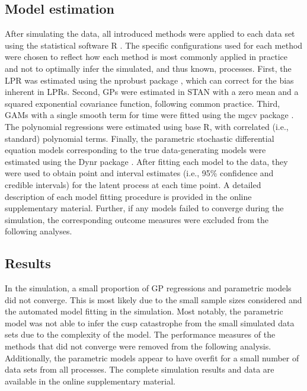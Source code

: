 \documentclass[man, floatsintext]{apa7}
\begin{document}
\subsection{Model estimation}

After simulating the data, all introduced methods were applied to each data set
using the statistical software R \parencite{R-base}. The specific
configurations used for each method were chosen to reflect how each method is
most commonly applied in practice and not to optimally infer the simulated, and
thus known, processes. First, the LPR was estimated using the nprobust package
\parencite{R-nprobust}, which can correct for the bias inherent in LPRs.
Second, GPs were estimated in STAN \parencite{R-cmdstanr} with a zero mean and
a squared exponential covariance function, following common practice. Third,
GAMs with a single smooth term for time were fitted using the mgcv package
\parencite{R-mgcv_a}. The polynomial regressions were estimated using base R,
with correlated (i.e., standard) polynomial terms. Finally, the parametric
stochastic differential equation models corresponding to the true
data-generating models were estimated using the Dynr package
\parencite{R-dynr}. After fitting each model to the data, they were used to
obtain point and interval estimates (i.e., 95\% confidence and credible
intervals) for the latent process at each time point. A detailed description of
each model fitting procedure is provided in the online supplementary material.
Further, if any models failed to converge during the simulation, the
corresponding outcome measures were excluded from the following analyses.

\subsection{Results}

In the simulation, a small proportion of GP regressions and parametric models
did not converge. This is most likely due to the small sample sizes considered
and the automated model fitting in the simulation. Most notably, the parametric
model was not able to infer the cusp catastrophe from the small simulated data
sets due to the complexity of the model. The performance measures of the
methods that did not converge were removed from the following analysis.
Additionally, the parametric models appear to have overfit for a small number
of data sets from all processes. The complete simulation results and data are
available in the online supplementary material.
\end{document}
